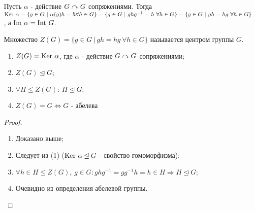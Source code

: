 Пусть $\alpha$ - действие $G\curvearrowright G$ сопряжениями. Тогда 
$\textup{Ker } \alpha = \{g \in G \ | \ \alpha(g)h = h \\ \forall h \in G\} = \{g \in G \ | \ ghg^{-1} = h \ \forall h \in G\} = \{g \in G \ | \ gh = hg \ \forall h \in G\}$, а $\textup{Im } \alpha = \textup{Int }G$.
\begin{definition}
    Множество $Z(G) = \{g \in G \ | \ gh = hg \ \forall h \in G\}$ называется центром группы $G$.
\end{definition}
\begin{properties}\tab
    \begin{enumerate}
        \item $Z(G) = \textup{Ker } \alpha$, где $\alpha$ - действие $G \curvearrowright G$ сопряжениями;
        \item $Z(G) \unlhd G$;
        \item $\forall H \leq Z(G): \ H \unlhd G$;
        \item $Z(G) = G \Longleftrightarrow G$ - абелева
    \end{enumerate}    
\end{properties}
\begin{proof}\tab
    \begin{enumerate}
        \item Доказано выше;
        \item Следует из (1) ($\textup{Ker }\alpha \unlhd G$ - свойство гомоморфизма);
        \item $\forall h \in H \leq Z(G),\ g \in G: ghg^{-1} = gg^{-1}h = h \in H \Longrightarrow H \unlhd G$;
        \item Очевидно из определения абелевой группы.
    \end{enumerate}
\end{proof}
